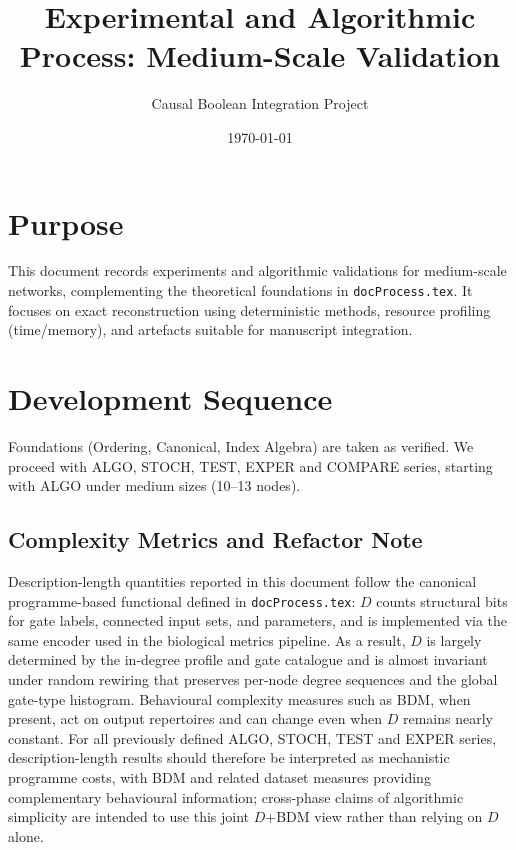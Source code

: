 \documentclass[11pt]{article}
\title{Experimental and Algorithmic Process: Medium-Scale Validation}
\author{Causal Boolean Integration Project}
\date{\today}
\begin{document}
\maketitle
\tableofcontents
\clearpage

\section{Purpose}
This document records experiments and algorithmic validations for medium-scale networks, complementing the theoretical foundations in \texttt{docProcess.tex}. It focuses on exact reconstruction using deterministic methods, resource profiling (time/memory), and artefacts suitable for manuscript integration.

\section{Development Sequence}
Foundations (Ordering, Canonical, Index Algebra) are taken as verified. We proceed with ALGO, STOCH, TEST, EXPER and COMPARE series, starting with ALGO under medium sizes (10--13 nodes).

\subsection*{Complexity Metrics and Refactor Note}
Description-length quantities reported in this document follow the canonical programme-based functional defined in \texttt{docProcess.tex}: \(D\) counts structural bits for gate labels, connected input sets, and parameters, and is implemented via the same encoder used in the biological metrics pipeline. As a result, \(D\) is largely determined by the in-degree profile and gate catalogue and is almost invariant under random rewiring that preserves per-node degree sequences and the global gate-type histogram. Behavioural complexity measures such as BDM, when present, act on output repertoires and can change even when \(D\) remains nearly constant. For all previously defined ALGO, STOCH, TEST and EXPER series, description-length results should therefore be interpreted as mechanistic programme costs, with BDM and related dataset measures providing complementary behavioural information; cross-phase claims of algorithmic simplicity are intended to use this joint \(D\)+BDM view rather than relying on \(D\) alone.\\
\end{document}
